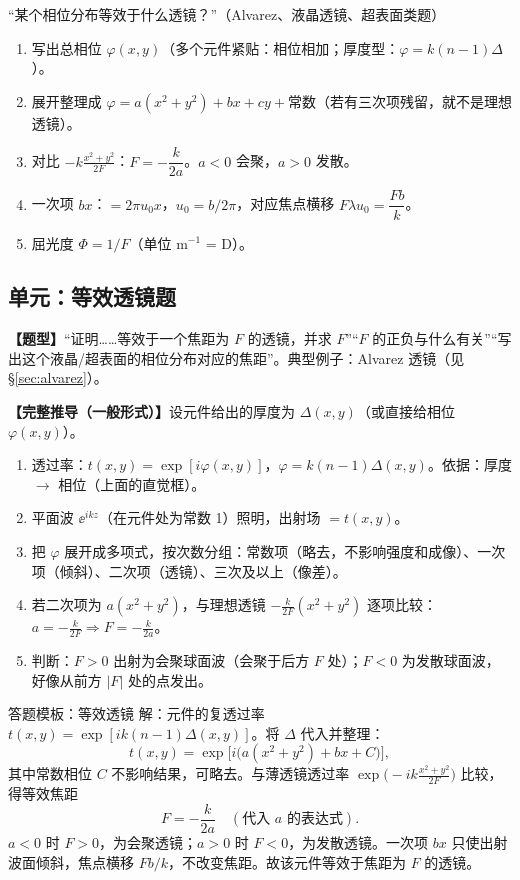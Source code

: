 \begin{recipe}{“某个相位分布等效于什么透镜？”（Alvarez、液晶透镜、超表面类题）}
\begin{enumerate}
\item 写出总相位 $\varphi(x,y)$（多个元件紧贴：相位相加；厚度型：$\varphi=k(n-1)\Delta$）。
\item 展开整理成 $\varphi=a(x^2+y^2)+bx+cy+\text{常数}$（若有三次项残留，就不是理想透镜）。
\item 对比 $-k\frac{x^2+y^2}{2F}$：$\boxed{F=-\dfrac{k}{2a}}$。$a<0$ 会聚，$a>0$ 发散。
\item 一次项 $bx$：$=2\pi u_0x$，$u_0=b/2\pi$，对应焦点横移 $F\lambda u_0=\dfrac{Fb}{k}$。
\item 屈光度 $\Phi=1/F$（单位 m$^{-1}$ = D）。
\end{enumerate}
\end{recipe}

\subsection*{单元：等效透镜题}\label{sec:equivlens}

\textbf{【题型】}“证明……等效于一个焦距为 $F$ 的透镜，并求 $F$”“$F$ 的正负与什么有关”“写出这个液晶/超表面的相位分布对应的焦距”。典型例子：Alvarez 透镜（见 §\ref{sec:alvarez}）。

\textbf{【完整推导（一般形式）】}设元件给出的厚度为 $\Delta(x,y)$（或直接给相位 $\varphi(x,y)$）。
\begin{enumerate}
\item 透过率：$t(x,y)=\exp[i\varphi(x,y)]$，$\varphi=k(n-1)\Delta(x,y)$。\quad 依据：厚度 $\to$ 相位（上面的直觉框）。
\item 平面波 $\ee^{ikz}$（在元件处为常数 1）照明，出射场 $=t(x,y)$。
\item 把 $\varphi$ 展开成多项式，按次数分组：常数项（略去，不影响强度和成像）、一次项（倾斜）、二次项（透镜）、三次及以上（像差）。
\item 若二次项为 $a(x^2+y^2)$，与理想透镜 $-\frac{k}{2F}(x^2+y^2)$ 逐项比较：$a=-\frac{k}{2F}\Rightarrow F=-\frac{k}{2a}$。
\item 判断：$F>0$ 出射为会聚球面波（会聚于后方 $F$ 处）；$F<0$ 为发散球面波，好像从前方 $|F|$ 处的点发出。
\end{enumerate}

\begin{exam}{答题模板：等效透镜}
解：元件的复透过率 $t(x,y)=\exp[ik(n-1)\Delta(x,y)]$。将 $\Delta$ 代入并整理：
\[
t(x,y)=\exp\!\Big[i\big(a(x^2+y^2)+bx+C\big)\Big],
\]
其中常数相位 $C$ 不影响结果，可略去。与薄透镜透过率 $\exp\!\big(-ik\frac{x^2+y^2}{2F}\big)$ 比较，得等效焦距
\[
F=-\frac{k}{2a}\quad(\text{代入 } a \text{ 的表达式}).
\]
$a<0$ 时 $F>0$，为会聚透镜；$a>0$ 时 $F<0$，为发散透镜。一次项 $bx$ 只使出射波面倾斜，焦点横移 $Fb/k$，不改变焦距。故该元件等效于焦距为 $F$ 的透镜。
\end{exam}

